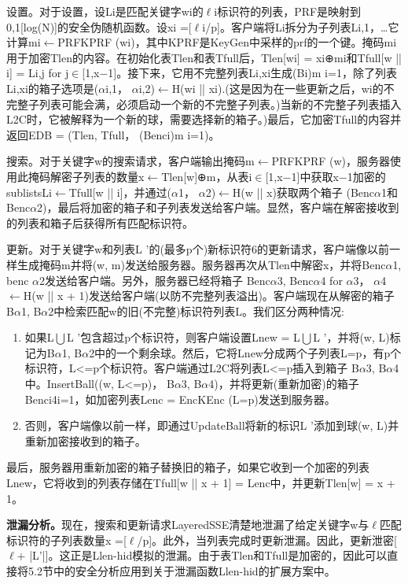 \documentclass[UTF8]{article}
\begin{document}
设置。对于设置，设Li是匹配关键字wi的$\ell$i标识符的列表，PRF是映射到{0,1}[log(N)]的安全伪随机函数。设xi =[$\ell$i/p]。客户端将Li拆分为子列表Li,1，…它计算mi$\leftarrow$PRFKPRF (wi)，其中KPRF是KeyGen中采样的prf的一个键。掩码mi用于加密Tlen的内容。在初始化表Tlen和表Tfull后，Tlen[wi] = xi⊕mi和Tfull[w || i] = Li,j for j$\in$[1,x−1]。接下来，它用不完整列表Li,xi生成(Bi)m i=1，除了列表Li,xi的箱子选项是($\alpha$i,1， $\alpha$i,2)$\leftarrow$H(wi || xi).(这是因为在一些更新之后，wi的不完整子列表可能会满，必须启动一个新的不完整子列表。)当新的不完整子列表插入L2C时，它被解释为一个新的球，需要选择新的箱子。)最后，它加密Tfull的内容并返回EDB = (Tlen, Tfull， (Benci)m i=1)。

搜索。对于关键字w的搜索请求，客户端输出掩码m$\leftarrow$PRFKPRF (w)，服务器使用此掩码解密子列表的数量x$\leftarrow$Tlen[w]⊕m，从表i$\in$[1,x−1]中获取x−1加密的sublistsLi$\leftarrow$Tfull[w || i]，并通过($\alpha$1， $\alpha$2)$\leftarrow$H(w || x)获取两个箱子 (Benc$\alpha$1和Benc$\alpha$2)，最后将加密的箱子和子列表发送给客户端。显然，客户端在解密接收到的列表和箱子后获得所有匹配标识符。

更新。对于关键字w和列表L '的(最多p个)新标识符6的更新请求，客户端像以前一样生成掩码m并将(w, m)发送给服务器。服务器再次从Tlen中解密x，并将Benc$\alpha$1, benc $\alpha$2发送给客户端。另外，服务器已经将箱子 Benc$\alpha$3, Benc$\alpha$4 for $\alpha$3， $\alpha$4$\leftarrow$H(w || x + 1)发送给客户端(以防不完整列表溢出)。客户端现在从解密的箱子 B$\alpha$1, B$\alpha$2中检索匹配w的旧(不完整)标识符列表L。我们区分两种情况:

\begin{enumerate}
  \item 如果L$\bigcup $L '包含超过p个标识符，则客户端设置Lnew = L$\bigcup $L '，并将(w, L)标记为B$\alpha$1, B$\alpha$2中的一个剩余球。然后，它将Lnew分成两个子列表L=p，有p个标识符，L<=p个标识符。客户端通过L2C将列表L<=p插入到箱子 B$\alpha$3, B$\alpha$4中。InsertBall((w, L<=p)， B$\alpha$3, B$\alpha$4)，并将更新(重新加密)的箱子 {Benci}4i=1，如加密列表Lenc = EncKEnc (L=p)发送到服务器。
  \item 否则，客户端像以前一样，即通过UpdateBall将新的标识L '添加到球(w, L)并重新加密接收到的箱子。
\end{enumerate}
最后，服务器用重新加密的箱子替换旧的箱子，如果它收到一个加密的列表Lnew，它将收到的列表存储在Tfull[w || x + 1] = Lenc中，并更新Tlen[w] = x + 1。

\textbf{泄漏分析。}现在，搜索和更新请求LayeredSSE清楚地泄漏了给定关键字w与$\ell$匹配标识符的子列表数量x =[$\ell$/p]。此外，当列表完成时更新泄漏。因此，更新泄密[$\ell$+ |L’|]。这正是Llen-hid模拟的泄漏。由于表Tlen和Tfull是加密的，因此可以直接将5.2节中的安全分析应用到关于泄漏函数Llen-hid的扩展方案中。
\end{document}
